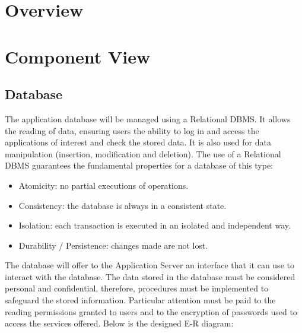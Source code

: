 \section{Overview}

\section{Component View}

\subsection{Database}
The application database will be managed using a Relational DBMS.
It allows the reading of data, ensuring users the ability to log in and access the applications of interest and check the stored data.
It is also used for data manipulation (insertion, modification and deletion).
The use of a Relational DBMS guarantees the fundamental properties for a database of this type:
\begin{itemize}
  \item Atomicity: no partial executions of operations.
  \item Consistency: the database is always in a consistent state.
  \item Isolation: each transaction is executed in an isolated and independent way.
  \item Durability / Persistence: changes made are not lost.
\end{itemize}
The database will offer to the Application Server an interface that it can use to interact with the database.
The data stored in the database must be considered personal and confidential, therefore, procedures must be implemented to safeguard the stored information.
Particular attention must be paid to the reading permissions granted to users and to the encryption of passwords used to access the services offered.
Below is the designed E-R diagram:


